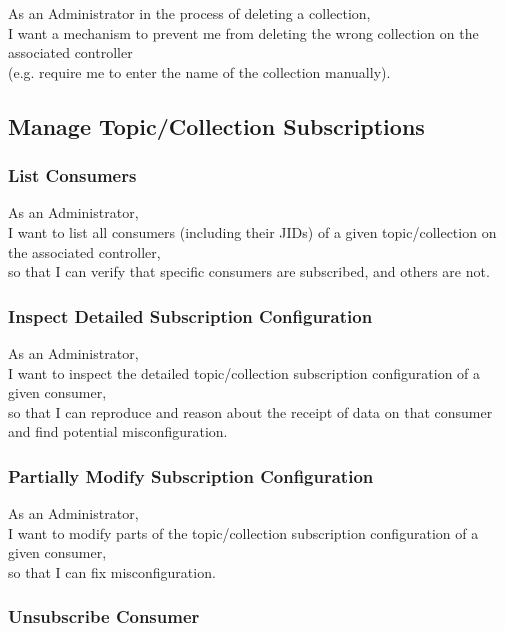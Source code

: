 As an Administrator in the process of deleting a collection, \\
I want a mechanism to prevent me from deleting the wrong collection on the associated controller\\
(e.g. require me to enter the name of the collection manually).


\subsection{Manage Topic/Collection Subscriptions}\label{sec:manage-subscriptions}

\subsubsection{List Consumers}

As an Administrator, \\
I want to list all consumers (including their JIDs) of a given topic/collection on the associated controller, \\
so that I can verify that specific consumers are subscribed, and others are not.


\subsubsection{Inspect Detailed Subscription Configuration}

As an Administrator, \\
I want to inspect the detailed topic/collection subscription configuration of a given consumer, \\
so that I can reproduce and reason about the receipt of data on that consumer
and find potential misconfiguration.

\subsubsection{Partially Modify Subscription Configuration}

As an Administrator, \\
I want to modify parts of the topic/collection subscription configuration of a given consumer, \\
so that I can fix misconfiguration.

\subsubsection{Unsubscribe Consumer}

